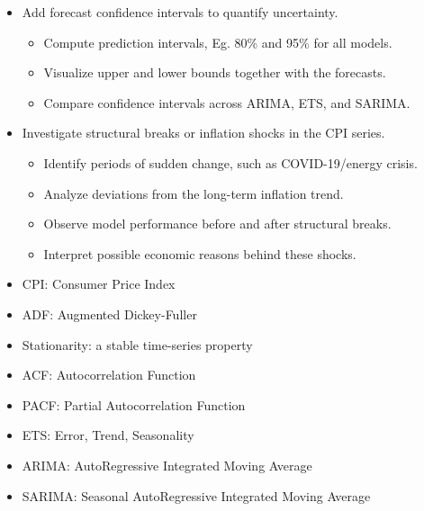 
{
    \begin{itemize}
        \item Add forecast confidence intervals to quantify uncertainty.
        {\scriptsize
        \begin{itemize}
            \setlength{\itemsep}{0.10em}
            \item Compute prediction intervals, Eg. 80\% and 95\% for all models.
            \item Visualize upper and lower bounds together with the forecasts.
            \item Compare confidence intervals across ARIMA, ETS, and SARIMA.
        \end{itemize}
        }
        \vspace{10pt}
        \item Investigate structural breaks or inflation shocks in the CPI series.
        {\scriptsize
        \begin{itemize}
            \setlength{\itemsep}{0.10em}
            \item Identify periods of sudden change, such as COVID-19/energy crisis.
            \item Analyze deviations from the long-term inflation trend.
            \item Observe model performance before and after structural breaks.
            \item Interpret possible economic reasons behind these shocks.
        \end{itemize}
        }

    \end{itemize}
}

{
    \begin{itemize}
        \item CPI: Consumer Price Index
        \item ADF: Augmented Dickey-Fuller
        \item Stationarity: a stable time-series property
        \item ACF: Autocorrelation Function
        \item PACF: Partial Autocorrelation Function
        \item ETS: Error, Trend, Seasonality
        \item ARIMA: AutoRegressive Integrated Moving Average
        \item SARIMA: Seasonal AutoRegressive Integrated Moving Average
    \end{itemize}
}

